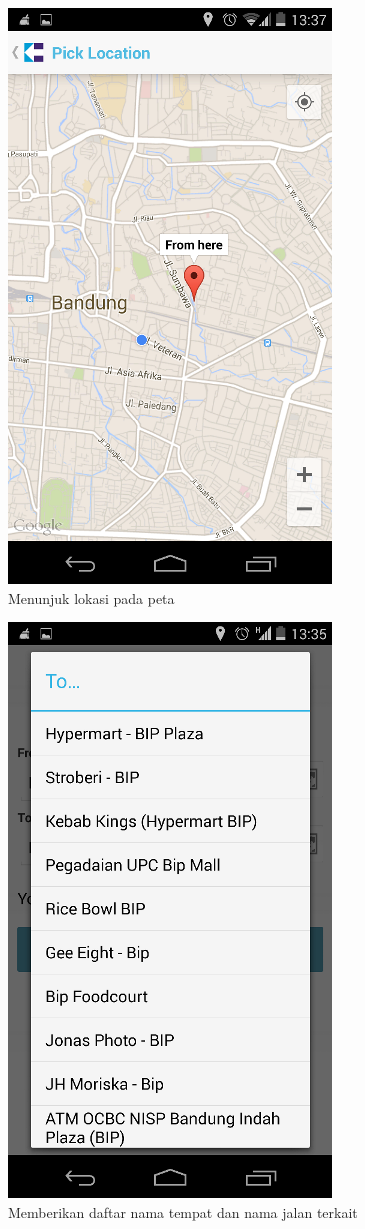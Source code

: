 \begin{figure}[h]
	\centering
		\includegraphics[scale=0.5]{Gambar/KIRI_Android/menunjuk_lokasi}
	\caption{Menunjuk lokasi pada peta}
	\label{fig:menunjuk}
\end{figure}

\begin{figure}[h]
	\centering
		\includegraphics[scale=0.5]{Gambar/KIRI_Android/terkait}
	\caption{Memberikan daftar nama tempat dan nama jalan terkait}
	\label{fig:terkait}
\end{figure}

